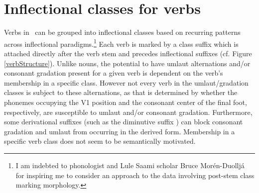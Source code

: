 \section{Inflectional classes for verbs}\label{verbInflectionalClasses}
Verbs in \PS\ can be grouped into inflectional classes based on recurring patterns across inflectional paradigms.\footnote{I am indebted to phonologist and Lule Saami scholar Bruce Morén-Duolljá for inspiring me to consider an approach to the data involving post-stem class marking morphology.} 
Each verb is marked by a class suffix which is attached directly after the verb stem and precedes inflectional suffixes (cf. Figure \vref{verbStructure}). %
Unlike nouns, the potential to have umlaut alternations and/or consonant gradation present for a given verb is dependent on the verb’s membership in a specific class. However not every verb in the umlaut/gradation classes is subject to these alternations, as that is determined by whether the phonemes occupying the V1 position and the consonant center of the final foot, respectively, are susceptible to umlaut and/or consonant gradation. 
Furthermore, some derivational suffixes (such as the diminutive suffix ) can block consonant gradation and umlaut from occurring in the derived form. 
Membership in a specific verb class does not seem to be semantically motivated. %

